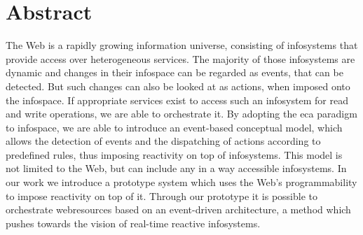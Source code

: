 \chapter*{Abstract}
The Web is a rapidly growing information universe, consisting of \textrm{\glspl{infosystem}} that provide access over heterogeneous services.
The majority of those \textrm{\glspl{infosystem}} are dynamic and changes in their \textrm{\gls{infospace}} can be regarded as events, that can be detected.
But such changes can also be looked at as actions, when imposed onto the \textrm{\gls{infospace}}.
If appropriate services exist to access such an \textrm{\gls{infosystem}} for read and write operations, we are able to orchestrate it.
By adopting the \textrm{\acrlong{eca}} paradigm to \textrm{\gls{infospace}}, we are able to introduce an event-based conceptual model, which allows the detection of events and the dispatching of actions according to predefined rules, thus imposing reactivity on top of \textrm{\glspl{infosystem}}.
This model is not limited to the Web, but can include any in a way accessible \textrm{\glspl{infosystem}}.
In our work we introduce a prototype system which uses the Web's programmability to impose reactivity on top of it.
Through our prototype it is possible to orchestrate \textrm{\glspl{webresource}} based on an event-driven architecture, a method which pushes towards the vision of real-time reactive \textrm{\glspl{infosystem}}.
